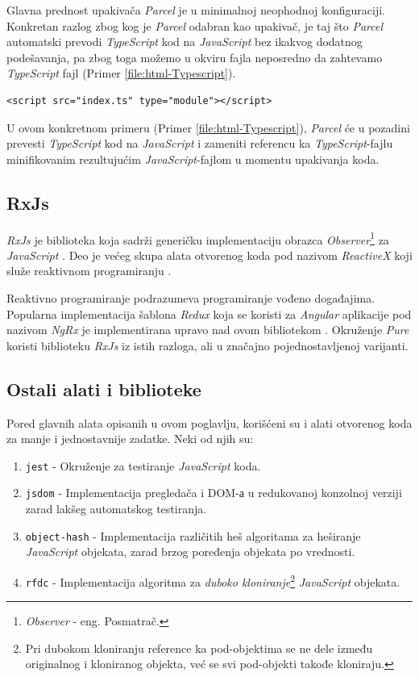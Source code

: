 \documentclass[12pt,oneside]{memoir}
\newcommand{\code}[1]{\allowbreak{\colorbox{codegray}{\texttt{\scalebox{0.9}{#1}}}}}%
\begin{document}
Glavna prednost upakivača \emph{Parcel} je u minimalnoj neophodnoj konfiguraciji.
Konkretan razlog zbog kog je \emph{Parcel} odabran kao upakivač, je taj što \emph{Parcel} automatski
prevodi \emph{TypeScript} kod na \emph{JavaScript} bez ikakvog dodatnog podešavanja, pa zbog toga možemo u okviru
fajla \code{index.html} neposredno da zahtevamo \emph{TypeScript} fajl (Primer \ref{file:html-Typescript}).
\begin{lstlisting}[style=htmlStyle,numberstyle=\tiny, caption={Uključivanje \emph{TypeScript} fajla neposredno u \code{index.html}}, label=file:html-Typescript]
<script src="index.ts" type="module"></script>
\end{lstlisting}
U ovom konkretnom primeru (Primer \ref{file:html-Typescript}), \emph{Parcel} će u pozadini prevesti \emph{TypeScript} kod na \emph{JavaScript}
i zameniti referencu ka \emph{TypeScript}-fajlu minifikovanim rezultujućim \emph{JavaScript}-fajlom u momentu upakivanja koda.
\pagebreak
\subsection{RxJs}
\emph{RxJs} je biblioteka koja sadrži generičku implementaciju obrazca \emph{Observer}\footnote{\emph{Observer} - eng. Posmatrač.} za \emph{JavaScript} \cite{GoF} \cite{RxJs}.
Deo je većeg skupa alata otvorenog koda pod nazivom \emph{ReactiveX} koji služe reaktivnom programiranju \cite{ReactiveX}.

Reaktivno programiranje podrazumeva programiranje vođeno događajima. Popularna implementacija šablona \emph{Redux} koja se koristi za \emph{Angular} aplikacije
pod nazivom \emph{NgRx} je implementirana upravo nad ovom bibliotekom \cite{Redux} \cite{NgRx}. Okruženje \emph{Pure} koristi
biblioteku \emph{RxJs} iz istih razloga, ali u značajno pojednostavljenoj varijanti.
\subsection{Ostali alati i biblioteke}
Pored glavnih alata opisanih u ovom poglavlju, korišćeni su i alati otvorenog koda za manje i jednostavnije zadatke.
Neki od njih su:
\begin{enumerate}
  \item \texttt{jest} - Okruženje za testiranje \emph{JavaScript} koda.
  \item \texttt{jsdom} - Implementacija pregledača i DOM-а u redukovanoj konzolnoj verziji zarad lakšeg automatskog testiranja.
  \item \texttt{object-hash} - Implementacija različitih heš algoritama za heširanje
  \emph{JavaScript} objekata, zarad brzog poređenja objekata po vrednosti.
  \item \texttt{rfdc} - Implementacija algoritma za \emph{duboko kloniranje}\footnote{Pri dubokom kloniranju reference ka pod-objektima se ne dele između originalnog i kloniranog objekta, već se svi pod-objekti takođe kloniraju.} \emph{JavaScript} objekata. 
\end{enumerate}
\end{document}
